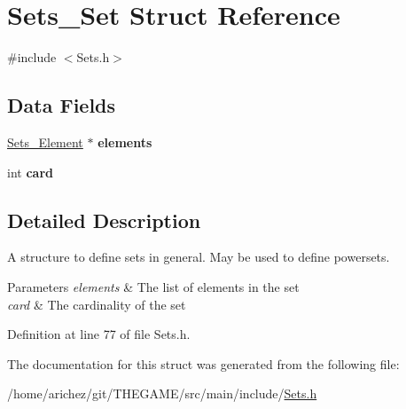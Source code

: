 \hypertarget{struct_sets___set}{\section{Sets\-\_\-\-Set Struct Reference}
\label{struct_sets___set}
}


{\ttfamily \#include $<$Sets.\-h$>$}

\subsection*{Data Fields}
\begin{DoxyCompactItemize}
\item 
\hypertarget{struct_sets___set_a2f23de91b701f2f4835a0827a4bb39cb}{\hyperlink{struct_sets___element}{Sets\-\_\-\-Element} $\ast$ {\bfseries elements}}\label{struct_sets___set_a2f23de91b701f2f4835a0827a4bb39cb}

\item 
\hypertarget{struct_sets___set_acd789e381a684163a021e2d228653afd}{int {\bfseries card}}\label{struct_sets___set_acd789e381a684163a021e2d228653afd}

\end{DoxyCompactItemize}


\subsection{Detailed Description}
A structure to define sets in general. May be used to define powersets. 
\begin{DoxyParams}{Parameters}
{\em elements} & The list of elements in the set \\
\hline
{\em card} & The cardinality of the set \\
\hline
\end{DoxyParams}


Definition at line 77 of file Sets.\-h.



The documentation for this struct was generated from the following file\-:\begin{DoxyCompactItemize}
\item 
/home/arichez/git/\-T\-H\-E\-G\-A\-M\-E/src/main/include/\hyperlink{_sets_8h}{Sets.\-h}\end{DoxyCompactItemize}
